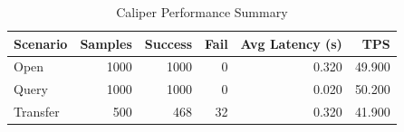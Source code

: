 \begin{table}
\caption{Caliper Performance Summary}
\label{tab:caliper_round}
\begin{tabular}{lrrrrr}
\toprule
Scenario & Samples & Success & Fail & Avg Latency (s) & TPS \\
\midrule
Open & 1000 & 1000 & 0 & 0.320 & 49.900 \\
Query & 1000 & 1000 & 0 & 0.020 & 50.200 \\
Transfer & 500 & 468 & 32 & 0.320 & 41.900 \\
\bottomrule
\end{tabular}
\end{table}

